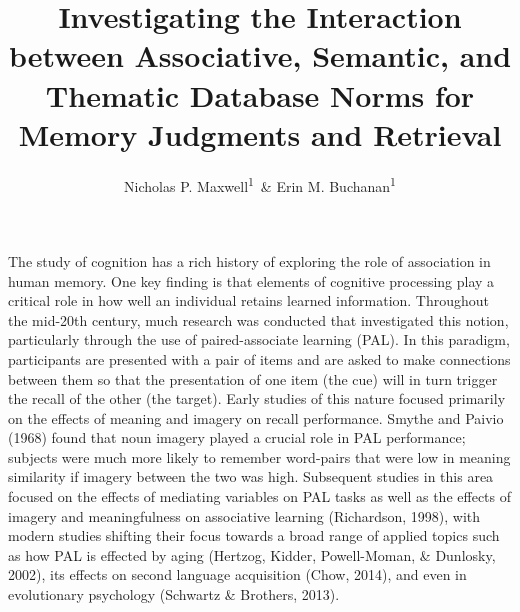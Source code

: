 \documentclass[english,man]{apa6}
\title{Investigating the Interaction between Associative, Semantic, and
Thematic Database Norms for Memory Judgments and Retrieval}
\author{Nicholas P. Maxwell\textsuperscript{1}~\& Erin M. Buchanan\textsuperscript{1}}
\affiliation{
    \vspace{0.5cm}
          \textsuperscript{1} Missouri State University  }
\theoremstyle{definition}
\theoremstyle{definition}
\theoremstyle{definition}
\theoremstyle{remark}
\begin{document}
\maketitle

\setcounter{secnumdepth}{0}



The study of cognition has a rich history of exploring the role of
association in human memory. One key finding is that elements of
cognitive processing play a critical role in how well an individual
retains learned information. Throughout the mid-20th century, much
research was conducted that investigated this notion, particularly
through the use of paired-associate learning (PAL). In this paradigm,
participants are presented with a pair of items and are asked to make
connections between them so that the presentation of one item (the cue)
will in turn trigger the recall of the other (the target). Early studies
of this nature focused primarily on the effects of meaning and imagery
on recall performance. Smythe and Paivio (1968) found that noun imagery
played a crucial role in PAL performance; subjects were much more likely
to remember word-pairs that were low in meaning similarity if imagery
between the two was high. Subsequent studies in this area focused on the
effects of mediating variables on PAL tasks as well as the effects of
imagery and meaningfulness on associative learning (Richardson, 1998),
with modern studies shifting their focus towards a broad range of
applied topics such as how PAL is effected by aging (Hertzog, Kidder,
Powell-Moman, \& Dunlosky, 2002), its effects on second language
acquisition (Chow, 2014), and even in evolutionary psychology (Schwartz
\& Brothers, 2013).
\end{document}
